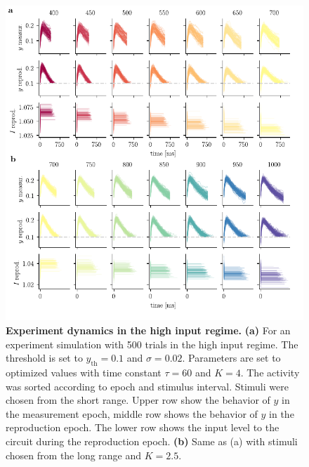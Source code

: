 \documentclass[10pt]{article}
\begin{document}
\begin{figure}[!htb]
	\centering
	\includegraphics{figures/supp_experiment_high.pdf}
	\caption{\textbf{Experiment dynamics in the high input regime.} 
	\textbf{(a)} For an experiment simulation with 500 trials in the high input regime. The threshold is set to $y_{\text{th}}=0.1$ and $\sigma=0.02$. Parameters are set to optimized values with time constant $\tau = 60$ and $K = 4$. The activity was sorted according to epoch and stimulus interval. Stimuli were chosen from the short range. Upper row show the behavior of $y$ in the measurement epoch, middle row shows the behavior of $y$ in the reproduction epoch. The lower row shows the input level to the circuit during the reproduction epoch. 
	\textbf{(b)} Same as (a) with stimuli chosen from the long range and $K = 2.5$.
	}
\label{sup:experiment_high}
\end{figure}
\end{document}
